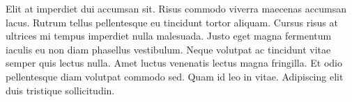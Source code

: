 \documentclass[paper = a4, fontsize = 12pt, numbers = noenddot, DIV = 15, twoside, 
paper = portrait,
listof = totoc,
listof = chapterentry,
egregdoesnotlikesansseriftitles, %
parskip = half %
]{scrbook}
\begin{document}
Elit at imperdiet dui accumsan sit. Risus commodo viverra maecenas accumsan lacus. Rutrum tellus pellentesque eu tincidunt tortor aliquam. Cursus risus at ultrices mi tempus imperdiet nulla malesuada. Justo eget magna fermentum iaculis eu non diam phasellus vestibulum. Neque volutpat ac tincidunt vitae semper quis lectus nulla. Amet luctus venenatis lectus magna fringilla. Et odio pellentesque diam volutpat commodo sed. Quam id leo in vitae. Adipiscing elit duis tristique sollicitudin.

\backmatter

\clearpage


\renewcommand\bibpreamble{Text added before the bibliography.

\begin{center}
	$\ast$~$\ast$~$\ast$
\end{center}}



\clearpage

\printindex
\end{document}
